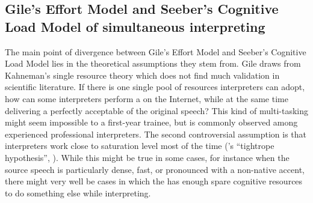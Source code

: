 \documentclass[output=paper]{langsci/langscibook}
\begin{document}
\subsection{Gile’s Effort Model and Seeber’s Cognitive Load Model of simultaneous interpreting}\label{sec:prandi:2.1}
The main point of divergence between Gile’s Effort Model \citep{Gile1988, Gile1997, Gile1999} and Seeber’s Cognitive Load Model lies in the theoretical assumptions they stem from. Gile draws from Kahneman’s single resource theory \citep{Kahneman1973}\linebreak which does not find much validation in scientific literature. If there is one single pool of resources interpreters can adopt, how can some interpreters perform a  on the Internet, while at the same time delivering a perfectly acceptable  of the original speech? This kind of multi-tasking might seem impossible to a first-year  trainee, but is commonly observed among experienced professional interpreters. The second controversial assumption is that interpreters work close to saturation level most of the time (\citeauthor{Gile1999}’s ``tightrope hypothesis'', \citeyear{Gile1999}). While this might be true in some cases, for instance when the source speech is particularly dense, fast, or pronounced with a non-native accent, there might very well be cases in which the  has enough spare cognitive resources to do something else while interpreting. 
\end{document}
